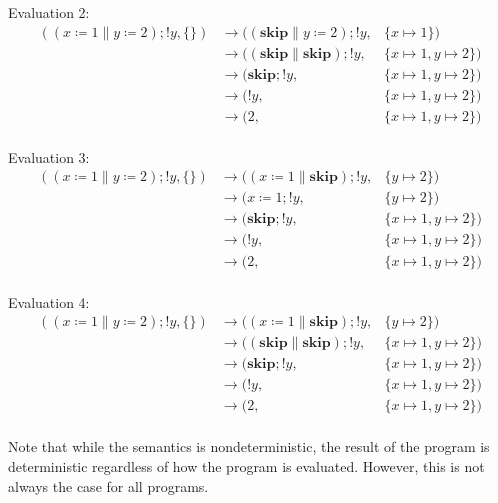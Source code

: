 Evaluation 2:
\[
  \begin{aligned}
    ((x \coloneqq 1 \parallel y \coloneqq 2); !y, \{\}) &\to ((\mathbf{skip} \parallel y \coloneqq 2); !y, &\{x \mapsto 1\}) \\
    &\to ((\mathbf{skip} \parallel \mathbf{skip}); !y, &\{x \mapsto 1, y \mapsto 2\}) \\
    &\to (\mathbf{skip}; !y, &\{x \mapsto 1, y \mapsto 2\}) \\
    &\to (!y, &\{x \mapsto 1, y \mapsto 2\}) \\
    &\to (2, &\{x \mapsto 1, y \mapsto 2\}) \\
  \end{aligned}
\]

Evaluation 3:
\[
  \begin{aligned}
    ((x \coloneqq 1 \parallel y \coloneqq 2); !y, \{\}) &\to ((x \coloneqq 1 \parallel \mathbf{skip}); !y, &\{y \mapsto 2\}) \\
    &\to (x \coloneqq 1; !y, &\{y \mapsto 2\}) \\
    &\to (\mathbf{skip}; !y, &\{x \mapsto 1, y \mapsto 2\}) \\
    &\to (!y, &\{x \mapsto 1, y \mapsto 2\}) \\
    &\to (2, &\{x \mapsto 1, y \mapsto 2\}) \\
  \end{aligned}
\]

Evaluation 4:
\[
  \begin{aligned}
    ((x \coloneqq 1 \parallel y \coloneqq 2); !y, \{\}) &\to ((x \coloneqq 1 \parallel \mathbf{skip}); !y, &\{y \mapsto 2\}) \\
    &\to ((\mathbf{skip} \parallel \mathbf{skip}); !y, &\{x \mapsto 1, y \mapsto 2\}) \\
    &\to (\mathbf{skip}; !y, &\{x \mapsto 1, y \mapsto 2\}) \\
    &\to (!y, &\{x \mapsto 1, y \mapsto 2\}) \\
    &\to (2, &\{x \mapsto 1, y \mapsto 2\}) \\
  \end{aligned}
\]

Note that while the semantics is nondeterministic, the result of the program is deterministic regardless of how the program is evaluated. However, this is not always the case for all programs.
